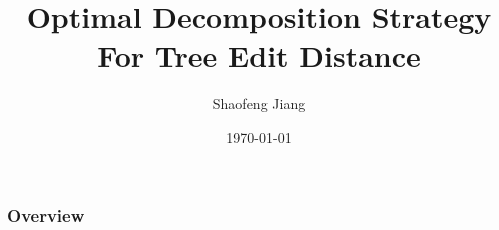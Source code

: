 \documentclass{beamer}
\title[Trees Edit Distance]{Optimal Decomposition Strategy For Tree Edit Distance} %
\author{Shaofeng Jiang} %
\institute[Western University] %
{
Supervised By Dr. Kaizhong Zhang\\ %
\medskip
\textit{sjian7@uwo.ca} %
}
\date{\today} %
\begin{document}
\begin{frame}
\titlepage %
\end{frame}

\begin{frame}
\frametitle{Overview} %
  \tableofcontents
\end{frame}


\end{document}
